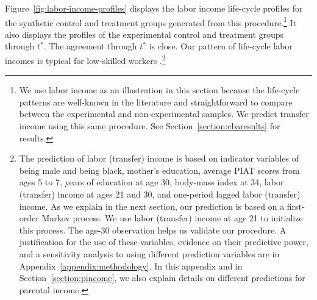 Figure~\ref{fig:labor-income-profiles} displays the labor income life-cycle profiles for the synthetic control and treatment groups generated from this procedure.\footnote{We use labor income as an illustration in this section because the life-cycle patterns are well-known in the literature and straightforward to compare between the experimental and non-experimental samples. We predict transfer income using this same procedure. See Section~\ref{section:cbaresults} for results.} It also displays the profiles of the experimental control and treatment groups through $t^*$. The agreement through $t^*$ is close. Our pattern of life-cycle labor incomes is typical for low-skilled workers \citep{Blundell-etal_2015_J-Pub-E,Gladden_Taber_2000_WageProgression,Sanders-Taber_2012_AR,Lagakos_Moll_etal_2016_LifeCycle_NBER}.\footnote{The prediction of labor (transfer) income is based on indicator variables of being male and being black, mother's education, average PIAT scores from ages 5 to 7, years of education at age 30, body-mass index at 34, labor (transfer) income at ages 21 and 30, and one-period lagged labor (transfer) income. As we explain in the next section, our prediction is based on a first-order Markov process. We use labor (transfer) income at age 21 to initialize this process. The age-30 observation helps us validate our procedure. A justification for the use of these variables, evidence on their predictive power, and a sensitivity analysis to using different prediction variables are in Appendix~\ref{appendix:methodology}. In this appendix and in Section~\ref{section:pincome}, we also explain details on different predictions for parental income.} 


